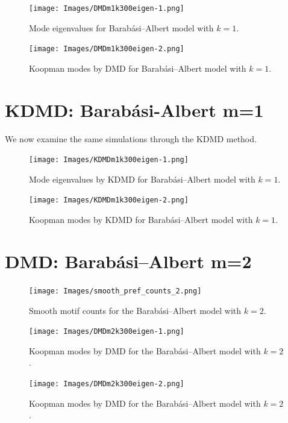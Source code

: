 \begin{figure}
    \texttt{[image: Images/DMDm1k300eigen-1.png]}
    \centering
    \caption{Mode eigenvalues for Barabási–Albert model
    with $k=1$.}
\end{figure}

\begin{figure}
    \texttt{[image: Images/DMDm1k300eigen-2.png]}
    \centering
    \caption{Koopman modes by DMD for Barabási–Albert model
    with $k=1$.}
\end{figure}

\clearpage

\section{KDMD: Barabási-Albert m=1}

We now examine the same simulations through the KDMD method.

\FloatBarrier

\begin{figure}
    \texttt{[image: Images/KDMDm1k300eigen-1.png]}
    \centering
    \caption{Mode eigenvalues by KDMD for Barabási–Albert model
    with $k=1$.}
\end{figure}

\begin{figure}
    \texttt{[image: Images/KDMDm1k300eigen-2.png]}
    \centering
    \caption{Koopman modes by KDMD for Barabási–Albert model
    with $k=1$.}
\end{figure}

\clearpage

\FloatBarrier

\section{DMD: Barabási–Albert m=2}

\begin{figure}
    \texttt{[image: Images/smooth\_pref\_counts\_2.png]}
    \centering
    \caption{Smooth motif counts for the Barabási–Albert model with $k=2$.}
\end{figure}

\clearpage
\begin{figure}
    \texttt{[image: Images/DMDm2k300eigen-1.png]}
    \centering
    \caption{Koopman modes by DMD for the Barabási–Albert model
    with $k=2$.}
\end{figure}

\begin{figure}
    \texttt{[image: Images/DMDm2k300eigen-2.png]}
    \centering
    \caption{Koopman modes by DMD for the Barabási–Albert model
    with $k=2$.}
\end{figure}

